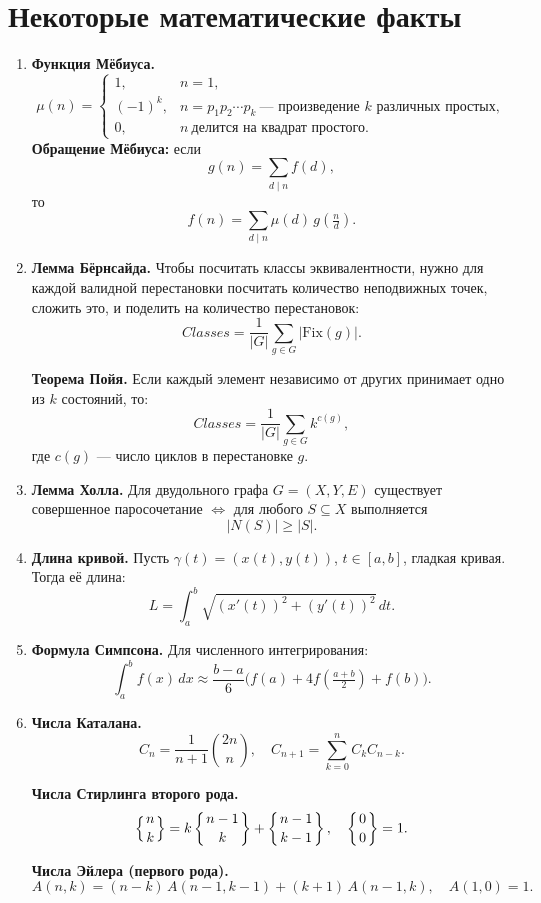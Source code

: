\documentclass[10pt]{article}
\begin{document}
\section*{Некоторые математические факты}

\begin{enumerate}
    \item \textbf{Функция Мёбиуса.}  
    \[
        \mu(n) =
        \begin{cases}
            1, & n = 1, \\
            (-1)^k, & n = p_1 p_2 \cdots p_k \ \text{--- произведение $k$ различных простых}, \\
            0, & n \ \text{делится на квадрат простого}.
        \end{cases}
    \]  
    \textbf{Обращение Мёбиуса:} если 
    \[
        g(n) = \sum_{d \mid n} f(d),
    \]
    то
    \[
        f(n) = \sum_{d \mid n} \mu(d)\, g\!\left(\tfrac{n}{d}\right).
    \]

    \item \textbf{Лемма Бёрнсайда.} Чтобы посчитать классы эквивалентности, нужно для каждой валидной перестановки посчитать количество неподвижных точек, сложить это, и поделить на количество перестановок:
    \[
        Classes = \frac{1}{|G|} \sum_{g \in G} | \mathrm{Fix}(g) |.
    \]  

    \textbf{Теорема Пойя.} Если каждый элемент независимо от других принимает одно из $k$ состояний, то:
    \[
        Classes= \frac{1}{|G|} \sum_{g \in G} k^{c(g)},
    \]
    где $c(g)$ --- число циклов в перестановке $g$.

    \item \textbf{Лемма Холла.} Для двудольного графа $G=(X,Y,E)$ существует совершенное паросочетание $\Leftrightarrow$ для любого $S \subseteq X$ выполняется
    \[
        |N(S)| \geq |S|.
    \]

    \item \textbf{Длина кривой.} Пусть $\gamma(t) = (x(t), y(t))$, $t \in [a,b]$, гладкая кривая. Тогда её длина:
    \[
        L = \int_a^b \sqrt{ (x'(t))^2 + (y'(t))^2 } \, dt.
    \]

    \item \textbf{Формула Симпсона.} Для численного интегрирования:
    \[
        \int_a^b f(x)\, dx \approx \frac{b-a}{6}\Big( f(a) + 4 f\!\left(\tfrac{a+b}{2}\right) + f(b) \Big).
    \]

    \item \textbf{Числа Каталана.}  
    \[
        C_n = \frac{1}{n+1}\binom{2n}{n}, \quad C_{n+1} = \sum_{k=0}^n C_k C_{n-k}.
    \]

    \textbf{Числа Стирлинга второго рода.}  
    \[
        \left\{ {n \atop k} \right\} = k \left\{ {n-1 \atop k} \right\} + \left\{ {n-1 \atop k-1} \right\}, \quad 
        \left\{ {0 \atop 0} \right\} = 1.
    \]

    \textbf{Числа Эйлера (первого рода).}  
    \[
        A(n,k) = (n-k)\, A(n-1, k-1) + (k+1)\, A(n-1,k), \quad A(1,0)=1.
    \]

\end{enumerate}
\end{document}
